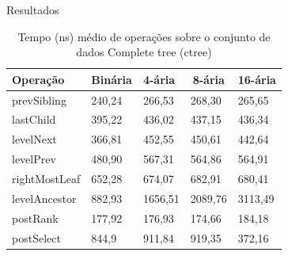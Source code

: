\begin{frame}{Resultados}
\begin{table}[]
    \centering
    \caption[Tempo médio de operações]{Tempo (ns) médio de operações sobre o conjunto de dados Complete tree (ctree)}
    \begin{tabular}{lllll}
    \hline
    \multicolumn{1}{l}{\textbf{Operação}} & \multicolumn{1}{l}{\textbf{Binária}} & \multicolumn{1}{l}{\textbf{4-ária}} & \multicolumn{1}{c}{\textbf{8-ária}} & \multicolumn{1}{l}{\textbf{16-ária}} \\ \hline
    prevSibling                             & 240,24                                & 266,53                               & 268,30                               & 265,65                                \\
    \rowcolor[HTML]{EFEFEF} 
    lastChild                               & 395,22                                & 436,02                               & 437,15                               & 436,34                                \\
    levelNext                               & 366,81                                & 452,55                               & 450,61                               & 442,64                                \\
    \rowcolor[HTML]{EFEFEF} 
    levelPrev                               & 480,90                                & 567,31                               & 564,86                               & 564,91                                \\
    rightMostLeaf                           & 652,28                                & 674,07                               & 682,91                               & 680,41                                \\
    \rowcolor[HTML]{EFEFEF} 
    levelAncestor                           & 882,93                                & 1656,51                              & 2089,76                              & 3113,49                               \\
    postRank                                & 177,92                                & 176,93                               & 174,66                               & 184,18                                \\
    \rowcolor[HTML]{EFEFEF} 
    postSelect                              & 844,9                                 & 911,84                               & 919,35                             & 372,16                 \\ \hline              
    \end{tabular}
    \end{table}
\end{frame}


